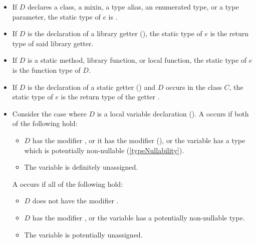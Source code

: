 \documentclass[makeidx]{article}
\begin{document}
\begin{itemize}
\item
  If $D$ declares a class, a mixin, a type alias, an enumerated type,
  or a type parameter,
  the static type of $e$ is .
\item
  If $D$ is the declaration of a library getter
  (),
  the static type of $e$ is the return type of said
  library getter.
\item
  If $D$ is a static method, library function, or local function,
  the static type of $e$ is the function type of $D$.

\item
  If $D$ is the declaration of a static getter
  ()
  and $D$ occurs in the class $C$,
  the static type of $e$ is the return type of the getter
  .
\item
  Consider the case where $D$ is a local variable declaration
  ().
  A  occurs if both of the following hold:
  \begin{itemize}
  \item $D$ has the modifier \LATE, or it has the modifier \FINAL{}
    (),
    or the variable \id{} has a type which is potentially non-nullable
    (\ref{typeNullability}).
  \item The variable \id{} is definitely unassigned.
  \end{itemize}


  A  occurs if all of the following hold:
  \begin{itemize}
  \item $D$ does not have the modifier \LATE.
  \item $D$ has the modifier \FINAL, or
    the variable \id{} has a potentially non-nullable type.
  \item The variable \id{} is potentially unassigned.
  \end{itemize}


\end{itemize}
\end{document}
